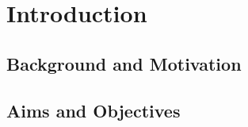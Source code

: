 \chapter{Introduction}
\label{ch:introduction}

\lipsum[1]

\section{Background and Motivation}
\label{sec:background}


\section{Aims and Objectives}
\label{sec:objectives}

